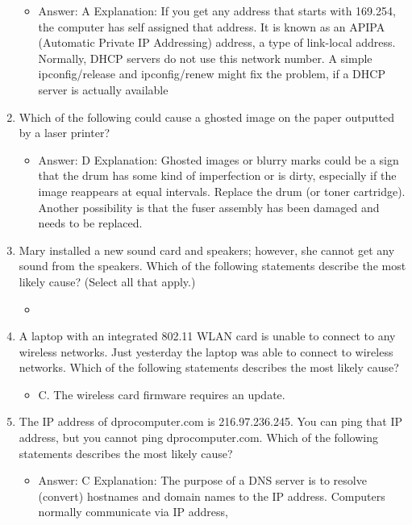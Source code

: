 \documentclass{article}
\begin{document}
\begin{enumerate}
    \begin{itemize}
        \item Answer: A
Explanation: If you get any address that starts with 169.254, the computer has self assigned
that address. It is known as an APIPA (Automatic Private IP Addressing)
address, a type of link-local address. Normally, DHCP servers do not use this network
number. A simple ipconfig/release and ipconfig/renew might fix the problem, if a
DHCP server is actually available
    \end{itemize}
    \item Which of the following could cause a ghosted image on the paper
outputted by a laser printer?
    \begin{itemize}
        \item Answer: D
Explanation: Ghosted images or blurry marks could be a sign that the drum has some
kind of imperfection or is dirty, especially if the image reappears at equal intervals.
Replace the drum (or toner cartridge). Another possibility is that the fuser assembly
has been damaged and needs to be replaced.
    \end{itemize}
    \item Mary installed a new sound card and speakers; however, she cannot
get any sound from the speakers. Which of the following statements
describe the most likely cause? (Select all that apply.)
    \begin{itemize}
        \item  
    \end{itemize}
    \item A laptop with an integrated 802.11 WLAN card is unable to connect
to any wireless networks. Just yesterday the laptop was able
to connect to wireless networks. Which of the following statements
describes the most likely cause?
    \begin{itemize}
        \item C. The wireless card firmware requires an update.
    \end{itemize}
    \item The IP address of dprocomputer.com is 216.97.236.245. You can
ping that IP address, but you cannot ping dprocomputer.com.
Which of the following statements describes the most likely cause?
    \begin{itemize}
        \item Answer: C
Explanation: The purpose of a DNS server is to resolve (convert) hostnames and
domain names to the IP address. Computers normally communicate via IP address,

\end{itemize}
\end{enumerate}
\end{document}

